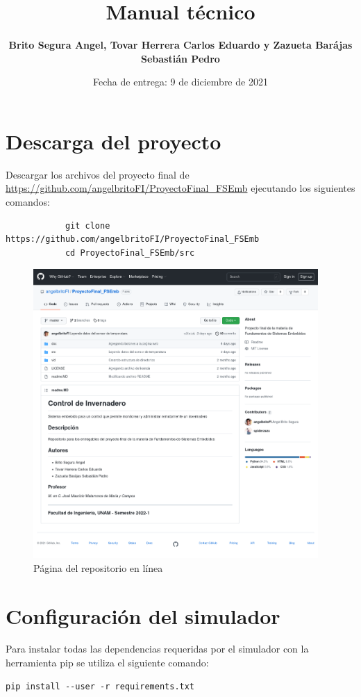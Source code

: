 \documentclass[letterpaper,10.5pt]{article} %
\title{Manual técnico}
\author{\textbf{Brito Segura Angel, Tovar Herrera Carlos Eduardo y Zazueta Barájas Sebastián Pedro}}
\date{Fecha de entrega: 9 de diciembre de 2021}
\begin{document}
    \pagestyle{fancy} %
    \maketitle %
    
    \section{Descarga del proyecto}
	    Descargar los archivos del proyecto final de \url{https://github.com/angelbritoFI/ProyectoFinal_FSEmb} ejecutando los siguientes comandos:
	    \begin{verbatim}
			git clone https://github.com/angelbritoFI/ProyectoFinal_FSEmb
			cd ProyectoFinal_FSEmb/src
		\end{verbatim}
		\begin{figure}[H]
			\centering
			\includegraphics[width=\linewidth, height=11cm]{img/repositorio.png}
			\caption{Página del repositorio en línea} %
			\label{fig:figura1} %
		\end{figure}
		
    \section{Configuración del simulador}
    	Para instalar todas las dependencias requeridas por el simulador con la herramienta pip se utiliza el siguiente comando:
    	\begin{verbatim}pip install --user -r requirements.txt\end{verbatim}
	
\end{document}

